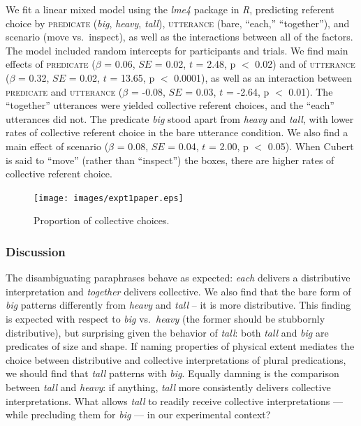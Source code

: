 \documentclass[linguex]{sp}
\begin{document}
We fit a linear mixed model \citep{baayenetal2008} using the \emph{lme4} package \citep{batesetal2014} in \emph{R}, predicting referent choice by \textsc{predicate} (\emph{big}, \emph{heavy}, \emph{tall}), \textsc{utterance} (bare, ``each,'' ``together''), and scenario (move vs.~inspect), as well as the interactions between all of the factors. The model included random intercepts for participants and trials. We find main effects of \textsc{predicate} ($\beta$ = 0.06, $SE$ = 0.02, $t$ = 2.48, p $<$ 0.02) and of \textsc{utterance} ($\beta$ = 0.32, $SE$ = 0.02, $t$ = 13.65, p $<$ 0.0001), as well as an interaction between \textsc{predicate} and \textsc{utterance} ($\beta$ = -0.08, $SE$ = 0.03, $t$ = -2.64, p $<$ 0.01). The ``together'' utterances were yielded collective referent choices, and the ``each'' utterances did not. The predicate \emph{big} stood apart from \emph{heavy} and \emph{tall}, with lower rates of collective referent choice in the bare utterance condition. We also find a main effect of scenario ($\beta$ = 0.08, $SE$ = 0.04, $t$ = 2.00, p $<$ 0.05). When Cubert is said to ``move'' (rather than ``inspect'') the boxes, there are higher rates of collective referent choice.

\begin{figure}[h]
	\centering
	\texttt{[image: images/expt1paper.eps]}
	\vspace{-15pt}
	\caption{Proportion of collective choices.}\label{results2}
\end{figure}


\subsubsection{Discussion}

The disambiguating paraphrases behave as expected: \emph{each} delivers a distributive interpretation and \emph{together} delivers collective. We also find that the bare form of \emph{big} patterns differently from \emph{heavy} and \emph{tall} -- it is more distributive. This finding is expected with respect to \textit{big} vs.~\textit{heavy} (the former should be stubbornly distributive), but surprising given the behavior of \textit{tall}: both \emph{tall} and \emph{big} are predicates of size and shape. If naming properties of physical extent mediates the choice between distributive and collective interpretations of plural predications, we should find that \emph{tall} patterns with \emph{big}. Equally damning is the comparison between \emph{tall} and \emph{heavy}: if anything, \emph{tall} more consistently delivers collective interpretations. What allows \emph{tall} to readily receive collective interpretations --- while precluding them for \emph{big} --- in our experimental context? 
\end{document}
